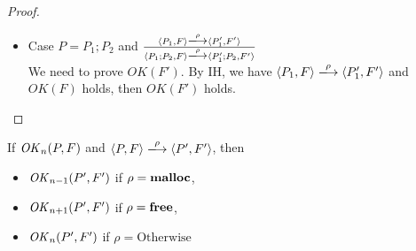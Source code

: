 \begin{proof}
\begin{itemize}
    \item Case \( P = P_1;P_2\) and \( \frac{ \langle P_1, F \rangle \xlongrightarrow{\rho} \langle P_1', F' \rangle }
      {\langle P_1;P_2, F \rangle \xlongrightarrow{\rho} \langle P_1';P_2, F' \rangle} \) \\
    We need to prove \(OK(F')\). By IH, we have \( \langle P_1, F
    \rangle \xlongrightarrow{\rho} \langle P_1', F' \rangle \) and \(
    OK(F) \) holds, then \(OK(F')\) holds.
      
      
  \end{itemize}
\end{proof}



\begin{lemma}
\label{lem:okPreserved}
If \(\mathit{OK}_n(P, F)\) and \( \langle P, F \rangle \xlongrightarrow{\rho} \langle P', F' \rangle\), then
\begin{itemize}
\item \(\mathit{OK}_{n-1}(P', F')\) if \(\rho = \mathbf{malloc}\),
\item \(\mathit{OK}_{n+1}(P', F')\) if \(\rho = \mathbf{free}\),
\item \(\mathit{OK}_n(P', F')\) if \(\rho = \mbox{Otherwise}  \)
\end{itemize}
\end{lemma}

